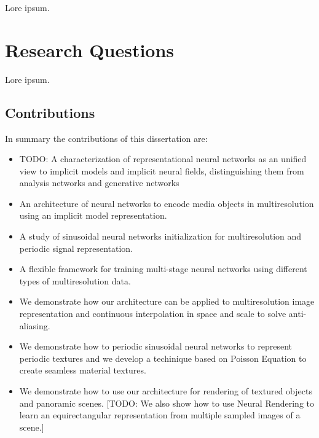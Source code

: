 Lore ipsum.

\section{Research Questions}

Lore ipsum.


\subsection{Contributions}

In summary the contributions of this dissertation are:

\begin{itemize}
    \item TODO: A characterization of representational neural networks as an unified view to implicit models and implicit neural fields, distinguishing them from analysis networks and generative networks
    \item An architecture of neural networks to encode media objects in multiresolution using an implicit model representation.
    \item A study of sinusoidal neural networks initialization for multiresolution and periodic signal representation.
    \item A flexible framework for training multi-stage neural networks using different types of multiresolution data.
    \item We demonstrate how our architecture can be applied to multiresolution image representation and continuous interpolation in space and scale to solve anti-aliasing.
    \item We demonstrate how to periodic sinusoidal neural networks to represent periodic textures and we develop a techinique based on Poisson Equation to create seamless material textures.
    \item We demonstrate how to use our architecture for rendering of textured objects and panoramic scenes. [TODO: We also show how to use Neural Rendering to learn an equirectangular representation from multiple sampled images of a scene.]
\end{itemize}